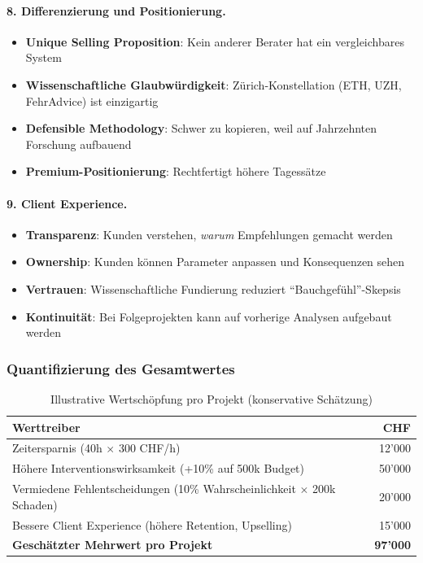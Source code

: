 \paragraph{8. Differenzierung und Positionierung.}

\begin{itemize}
    \item \textbf{Unique Selling Proposition}: Kein anderer Berater hat ein vergleichbares System
    \item \textbf{Wissenschaftliche Glaubwürdigkeit}: Zürich-Konstellation (ETH, UZH, FehrAdvice) ist einzigartig
    \item \textbf{Defensible Methodology}: Schwer zu kopieren, weil auf Jahrzehnten Forschung aufbauend
    \item \textbf{Premium-Positionierung}: Rechtfertigt höhere Tagessätze
\end{itemize}

\paragraph{9. Client Experience.}

\begin{itemize}
    \item \textbf{Transparenz}: Kunden verstehen, \textit{warum} Empfehlungen gemacht werden
    \item \textbf{Ownership}: Kunden können Parameter anpassen und Konsequenzen sehen
    \item \textbf{Vertrauen}: Wissenschaftliche Fundierung reduziert ``Bauchgefühl''-Skepsis
    \item \textbf{Kontinuität}: Bei Folgeprojekten kann auf vorherige Analysen aufgebaut werden
\end{itemize}

\subsubsection{Quantifizierung des Gesamtwertes}

\begin{table}[h]
\centering
\caption{Illustrative Wertschöpfung pro Projekt (konservative Schätzung)}
\begin{tabular}{@{}lr@{}}
\toprule
\textbf{Werttreiber} & \textbf{CHF} \\
\midrule
Zeitersparnis (40h $\times$ 300 CHF/h) & 12'000 \\
Höhere Interventionswirksamkeit (+10\% auf 500k Budget) & 50'000 \\
Vermiedene Fehlentscheidungen (10\% Wahrscheinlichkeit $\times$ 200k Schaden) & 20'000 \\
Bessere Client Experience (höhere Retention, Upselling) & 15'000 \\
\midrule
\textbf{Geschätzter Mehrwert pro Projekt} & \textbf{97'000} \\
\bottomrule
\end{tabular}
\end{table}

